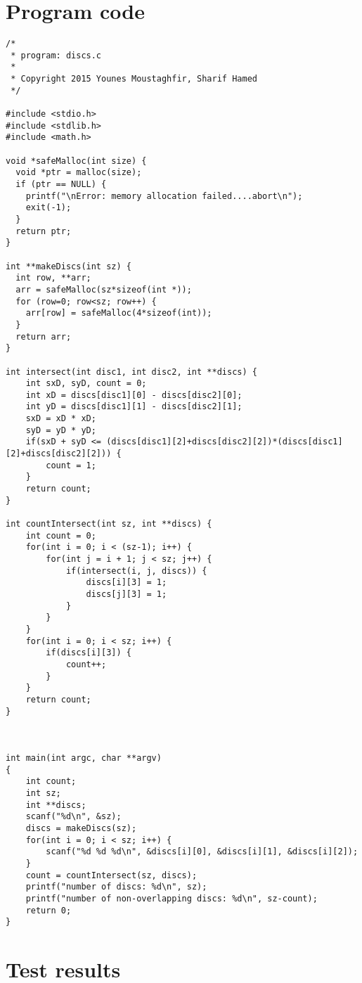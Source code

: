 \documentclass[a4paper,10pt]{article}
\begin{document}
\section{Program code}
\begin{lstlisting}[style = code, title = market.c]
/*
 * program: discs.c
 * 
 * Copyright 2015 Younes Moustaghfir, Sharif Hamed
 */ 

#include <stdio.h>
#include <stdlib.h>
#include <math.h>

void *safeMalloc(int size) {
  void *ptr = malloc(size);
  if (ptr == NULL) {
    printf("\nError: memory allocation failed....abort\n");
    exit(-1);
  }
  return ptr;
}

int **makeDiscs(int sz) {
  int row, **arr;
  arr = safeMalloc(sz*sizeof(int *));
  for (row=0; row<sz; row++) {
    arr[row] = safeMalloc(4*sizeof(int));
  }
  return arr;
}

int intersect(int disc1, int disc2, int **discs) {
	int sxD, syD, count = 0;
	int xD = discs[disc1][0] - discs[disc2][0];
	int yD = discs[disc1][1] - discs[disc2][1];
	sxD = xD * xD;
	syD = yD * yD;
	if(sxD + syD <= (discs[disc1][2]+discs[disc2][2])*(discs[disc1][2]+discs[disc2][2])) {
		count = 1;
	}
	return count;
}

int countIntersect(int sz, int **discs) {
	int count = 0;
	for(int i = 0; i < (sz-1); i++) {
		for(int j = i + 1; j < sz; j++) {
			if(intersect(i, j, discs)) {
				discs[i][3] = 1;
				discs[j][3] = 1;
			}
		}
	}
	for(int i = 0; i < sz; i++) {
		if(discs[i][3]) {
			count++;
		}
	}
	return count;
}



int main(int argc, char **argv)
{
	int count;
	int sz;
	int **discs;
	scanf("%d\n", &sz);
	discs = makeDiscs(sz);
	for(int i = 0; i < sz; i++) {
		scanf("%d %d %d\n", &discs[i][0], &discs[i][1], &discs[i][2]);
	}
	count = countIntersect(sz, discs);
	printf("number of discs: %d\n", sz);
	printf("number of non-overlapping discs: %d\n", sz-count);
	return 0;
}

\end{lstlisting}

\section{Test results}
\end{document}
